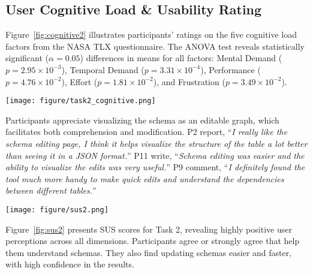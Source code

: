 \subsection{User Cognitive Load \& Usability Rating}

Figure~\ref{fig:cognitive2} illustrates participants' ratings on the five cognitive load factors from the NASA TLX questionnaire. The ANOVA test reveals statistically significant ($\alpha = 0.05$) differences in means for all factors: Mental Demand ($p = 2.95 \times 10^{-3}$), Temporal Demand ($p = 3.31 \times 10^{-4}$), Performance ($p = 4.76 \times 10^{-2}$), Effort ($p = 1.81 \times 10^{-2}$), and Frustration ($p = 3.49 \times 10^{-2}$).

\begin{figure*}[ht]
  \centering
  \texttt{[image: figure/task2\_cognitive.png]}
  \caption{NASA Task Load Index Ratings of Schema Customization}
  \label{fig:cognitive2}
\end{figure*}


Participants appreciate visualizing the schema as an editable graph, which facilitates both comprehension and modification.
P2 report, ``\textit{I really like the schema editing page, I think it helps visualize the structure of the table a lot better than seeing it in a JSON format.}''
P11 write, ``\textit{Schema editing was easier and the ability to visualize the edits was very useful.}''
P9 comment, ``\textit{I definitely found the tool much more handy to make quick edits and understand the dependencies between different tables.}''


\begin{figure*}[ht]
  \centering
  \texttt{[image: figure/sus2.png]}
  \caption{SUS Scores of Schema Customization}
  \label{fig:sus2}
\end{figure*}

Figure~\ref{fig:sus2} presents SUS scores for Task 2, revealing highly positive user perceptions across all dimensions. 
Participants agree or strongly agree that {\tool} help them understand schemas. 
They also find updating schemas easier and faster, with high confidence in the results.




